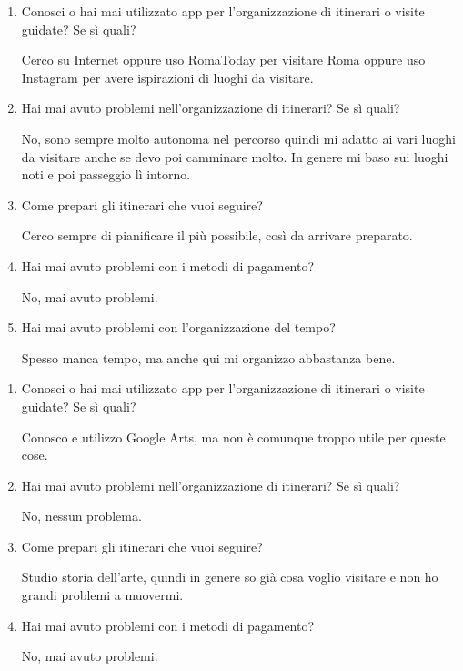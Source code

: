 \begin{enumerate}

\item Conosci o hai mai utilizzato app per l'organizzazione di itinerari o visite guidate? Se sì quali?

Cerco su Internet oppure uso RomaToday per visitare Roma oppure uso Instagram per avere ispirazioni di luoghi da visitare.

\item Hai mai avuto problemi nell'organizzazione di itinerari? Se sì quali?

No, sono sempre molto autonoma nel percorso quindi mi adatto ai vari luoghi da visitare anche se devo poi camminare molto. In genere mi baso sui luoghi noti e poi passeggio lì intorno.

\item Come prepari gli itinerari che vuoi seguire?

Cerco sempre di pianificare il più possibile, così da arrivare preparato.

\item Hai mai avuto problemi con i metodi di pagamento?

No, mai avuto problemi.

\item Hai mai avuto problemi con l'organizzazione del tempo?

Spesso manca tempo, ma anche qui mi organizzo abbastanza bene.

\end{enumerate}

\clearpage
{}

\begin{enumerate}

\item Conosci o hai mai utilizzato app per l'organizzazione di itinerari o visite guidate? Se sì quali?

Conosco e utilizzo Google Arts, ma non è comunque troppo utile per queste cose.

\item Hai mai avuto problemi nell'organizzazione di itinerari? Se sì quali?

No, nessun problema.

\item Come prepari gli itinerari che vuoi seguire?

Studio storia dell'arte, quindi in genere so già cosa voglio visitare e non ho grandi problemi a muovermi.

\item Hai mai avuto problemi con i metodi di pagamento?

No, mai avuto problemi.

\end{enumerate}

